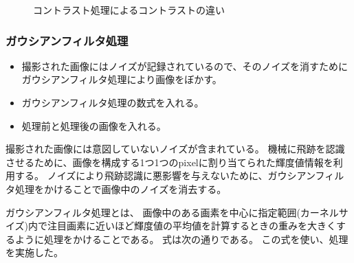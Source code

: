 \documentclass[12pt,a4paper]{jarticle}
\begin{document}
\begin{figure}[htbp]
\begin{center}
\begin{tabular}{c}
      \end{tabular}
      \caption{コントラスト処理によるコントラストの違い\label{fig:do_contrust_beforeandafter}}
    \end{center}
\end{figure}
\subsubsection{ガウシアンフィルタ処理}
\begin{itemize}
    \item 撮影された画像にはノイズが記録されているので、そのノイズを消すためにガウシアンフィルタ処理により画像をぼかす。
    \item ガウシアンフィルタ処理の数式を入れる。
    \item 処理前と処理後の画像を入れる。
\end{itemize}
撮影された画像には意図していないノイズが含まれている。
機械に飛跡を認識させるために、画像を構成する1つ1つのpixelに割り当てられた輝度値情報を利用する。
ノイズにより飛跡認識に悪影響を与えないために、ガウシアンフィルタ処理をかけることで画像中のノイズを消去する。
\par
ガウシアンフィルタ処理とは、
画像中のある画素を中心に指定範囲(カーネルサイズ)内で注目画素に近いほど輝度値の平均値を計算するときの重みを大きくするように処理をかけることである。
式は次の通りである。
この式を使い、処理を実施した。
\end{document}
